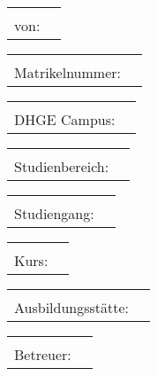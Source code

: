 \vspace{\fill}
\maketitle


\begin{tabular}{rl}
	\hspace{0.45\textwidth} &              \\
	        von: & \CAUTHOR
\end{tabular}

\begin{tabular}{rl}
	\hspace{0.45\textwidth} &         \\
	 Matrikelnummer: & \CMATRIKEL
\end{tabular}

\begin{tabular}{rl}
	\hspace{0.45\textwidth} &      \\
	DHGE Campus: & \CCAMPUS
\end{tabular}

\begin{tabular}{rl}
	 \hspace{0.45\textwidth} &         \\
	Studienbereich: & \CBEREICH
\end{tabular}

\begin{tabular}{rl}
	\hspace{0.45\textwidth} &                       \\
	Studiengang: & \CSTUDIENGANG
\end{tabular}

\begin{tabular}{rl}
	\hspace{0.45\textwidth} &       \\
	       Kurs: & \CKURS
\end{tabular}

\begin{tabular}{rl}
	\hspace{0.45\textwidth} &          \\
	Ausbildungsstätte: & \CBETRIEB
\end{tabular}

\begin{tabular}{rl}
	\hspace{0.45\textwidth} &          \\
	   Betreuer: & \CBETREUER
\end{tabular}

\vspace*{\fill}

\pagebreak
